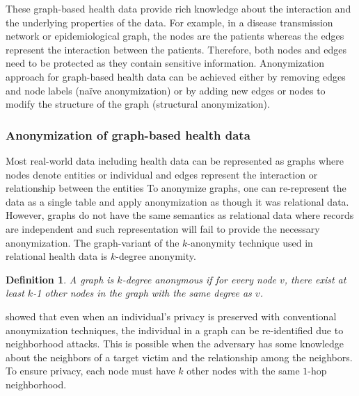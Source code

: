 \documentclass{bioinfo}
\newtheorem{definition}{Definition}
\begin{document}
These graph-based health data provide rich knowledge about the interaction and the underlying properties of the data. For example, in a disease transmission network or epidemiological graph, the nodes are the patients whereas the edges represent the interaction between the patients. Therefore, both nodes and edges need to be protected as they contain sensitive information. Anonymization approach for graph-based health data can be achieved either by removing edges and node labels (na\"{i}ve anonymization) or by adding new edges or nodes to modify the structure of the graph (structural anonymization).



\subsubsection{Anonymization of graph-based health data}
\label{sec:graphanon}
Most real-world data including health data can be represented as graphs where nodes denote entities or individual and edges represent the interaction or relationship between the entities 
To anonymize graphs, one can re-represent the data as a single table and apply anonymization as though it was relational data. However, graphs do not have the same semantics as relational data where records are independent and such representation will fail to provide the necessary anonymization. The graph-variant of the $k$-anonymity technique used in relational health data is $k$-degree anonymity. 

\begin{definition}
\label{def:kdegreeanonymity}
A graph is $k$-degree anonymous if for every node $v$, there exist at least $k$-1 other nodes in the graph with the same degree as $v$.
\end{definition}

\citet{cite518zhou2008preserving} showed that even when an individual's privacy is preserved with conventional anonymization techniques, the individual in a graph can be re-identified due to neighborhood attacks. This is possible when the adversary has some knowledge about the neighbors of a target victim and the relationship among the neighbors. To ensure privacy, each node must have $k$ other nodes with the same $1$-hop neighborhood.
\end{document}
